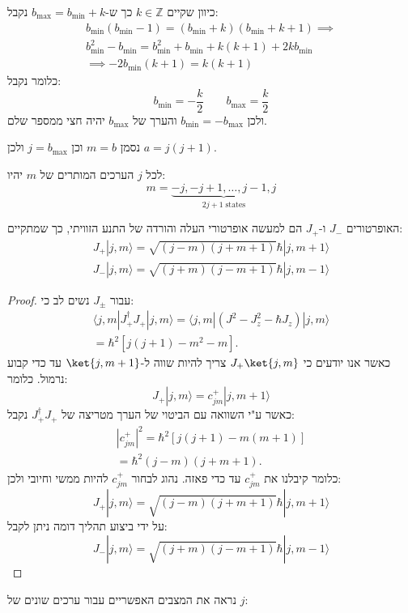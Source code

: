 \documentclass{tstextbook}
\begin{document}
\begin{corollary}
כיוון שקיים \(k \in \mathbb{Z}\) כך ש-\(b_{\max}=b_{\text{min}}+k\) נקבל:
$$\begin{gather}b_{\min}\left( b_{\min}-1 \right)=\left( b_{\min}+k \right)\left( b_{\min}+k+1 \right)\implies \\ b_{\min}^{2}-b_{\min}=b_{\min}^{2}+b_{\min}+k(k+1)+2kb_{\min}\\ \implies -2b_{\min}(k+1)=k(k+1) 
\end{gather}$$
כלומר נקבל:
$$b_{\min}=-\frac{k}{2}\qquad b_{\max}=\frac{k}{2}$$
ולכן \(b_{\text{min}}=-b_{\text{max}}\) והערך של \(b_{\text{max}}\) יהיה חצי ממספר שלם.

\end{corollary}
\begin{symbolize}
נסמן \(m=b\) וכן \(j=b_{\text{max}}\) ולכן \(a=j(j+1)\). 

\end{symbolize}
\begin{corollary}
לכל \(j\) הערכים המותרים של \(m\) יהיו:
$$m=\underbrace{-j,-j+1,\ldots,j-1,j}_{2j+1\;{\mathrm{states}}}$$

\end{corollary}
\begin{proposition}
האופרטורים \(J_{-}\) ו-\(J_{+}\) הם למעשה אופרטורי העלה והורדה של התנע הזוויתי, כך שמתקיים:
$$\begin{gather}J_{+}|j,m\rangle=\sqrt{(j-m)(j+m+1)}\hbar|j,m+1\rangle\\J_{-}|j,m\rangle=\sqrt{(j+m)(j-m+1)}\hbar|j,m-1\rangle 
\end{gather}$$

\end{proposition}
\begin{proof}
עבור \(J_{\pm}\) נשים לב כי:
$$\begin{array}{c}{{\langle j,m|J_{+}^{\dagger}J_{+}|j,m\rangle=\langle j,m|(J^{2}-J_{z}^{2}-\hbar J_{z})|j,m\rangle}}\\ {{=\hbar^{2}[j(j+1)-m^{2}-m].}}\end{array}$$
כאשר אנו יודעים כי \(J_{+}\ket{ j,m}\) צריך להיות שווה ל-\(\ket{j,m+1}\) עד כדי קבוע נרמול. כלומר:
$$J_{+}|j,m\rangle=c_{j m}^{+}|j,m+1\rangle$$
כאשר ע"י השוואה עם הביטוי של הערך מטריצה של \(J_{+}^{\dagger}J_{+}\) נקבל:
$$\begin{array}{c}{{|c_{j m}^{+}|^{2}=\hbar^{2}[j(j+1)-m(m+1)]}}\\ {{=\hbar^{2}(j-m)(j+m+1).}}\end{array}$$
כלומר קיבלנו את \(c_{jm}^{+}\) עד כדי פאזה. נהוג לבחור \(c_{jm}^{+}\) להיות ממשי וחיובי ולכן:
$$J_{+}|j,m\rangle=\sqrt{(j-m)(j+m+1)}\hbar|j,m+1\rangle$$
על ידי ביצוע תהליך דומה ניתן לקבל:
$$J_{-}|j,m\rangle=\sqrt{(j+m)(j-m+1)}\hbar|j,m-1\rangle$$

\end{proof}
נראה את המצבים האפשריים עבור ערכים שונים של \(j\):
\end{document}
